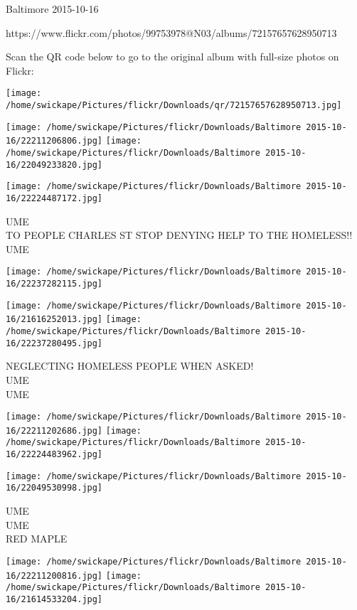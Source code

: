 \documentclass[10pt,letterpaper]{article}
\begin{document}
Baltimore 2015-10-16

https://www.flickr.com/photos/99753978@N03/albums/72157657628950713

Scan the QR code below to go to the original album with full-size photos on Flickr:

\texttt{[image: /home/swickape/Pictures/flickr/Downloads/qr/72157657628950713.jpg]}
\pagebreak

\texttt{[image: /home/swickape/Pictures/flickr/Downloads/Baltimore 2015-10-16/22211206806.jpg]}
\texttt{[image: /home/swickape/Pictures/flickr/Downloads/Baltimore 2015-10-16/22049233820.jpg]}

\texttt{[image: /home/swickape/Pictures/flickr/Downloads/Baltimore 2015-10-16/22224487172.jpg]}

UME\\
TO PEOPLE CHARLES ST STOP DENYING HELP TO THE HOMELESS!!\\
UME\\
\pagebreak

\texttt{[image: /home/swickape/Pictures/flickr/Downloads/Baltimore 2015-10-16/22237282115.jpg]}

\vspace{0.25in}
\texttt{[image: /home/swickape/Pictures/flickr/Downloads/Baltimore 2015-10-16/21616252013.jpg]}
\texttt{[image: /home/swickape/Pictures/flickr/Downloads/Baltimore 2015-10-16/22237280495.jpg]}

NEGLECTING HOMELESS PEOPLE WHEN ASKED!\\
UME\\
UME\\
\pagebreak

\texttt{[image: /home/swickape/Pictures/flickr/Downloads/Baltimore 2015-10-16/22211202686.jpg]}
\texttt{[image: /home/swickape/Pictures/flickr/Downloads/Baltimore 2015-10-16/22224483962.jpg]}

\vspace{0.25in}
\texttt{[image: /home/swickape/Pictures/flickr/Downloads/Baltimore 2015-10-16/22049530998.jpg]}

UME\\
UME\\
RED MAPLE\\
\pagebreak

\texttt{[image: /home/swickape/Pictures/flickr/Downloads/Baltimore 2015-10-16/22211200816.jpg]}
\texttt{[image: /home/swickape/Pictures/flickr/Downloads/Baltimore 2015-10-16/21614533204.jpg]}
\end{document}
